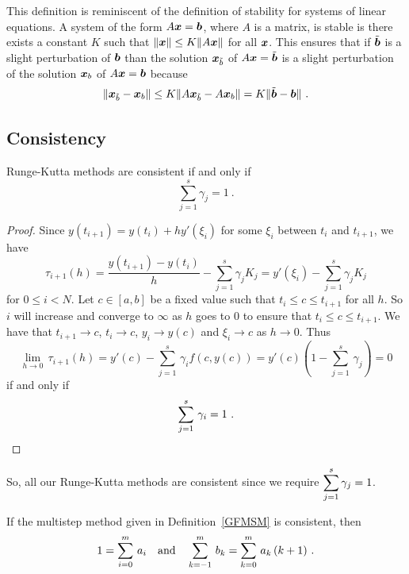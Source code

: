 \begin{rmk}
This definition is reminiscent of the definition of stability for
systems of linear equations.  A system of the form $A \bm{x} = \bm{b}$,
where $A$ is a \nn matrix, is stable is there exists a constant $K$ such
that $\|\bm{x} \| \leq K \|A \bm{x}\|$ for all $\bm{x}$.  This ensures
that if $\tilde{\bm{b}}$ is a slight perturbation of $\bm{b}$ than
the solution $\bm{x}_{\tilde{b}}$ of $A \bm{x} = \tilde{\bm{b}}$ is a slight
perturbation of the solution $\bm{x}_b$ of $A \bm{x} = \bm{b}$ because
\[
\|\bm{x}_{\tilde{b}} - \bm{x}_b \|
\leq K \|A\bm{x}_{\tilde{b}} - A \bm{x}_b \|
= K \|\tilde{\bm{b}}- \bm{b} \| \ .
\]
\end{rmk}

\subsection{Consistency}

\begin{prop}
Runge-Kutta methods are consistent if and only if
\[
\sum_{j=1}^s \gamma_j = 1 \ .
\]
\end{prop}

\begin{proof}
Since $y(t_{i+1}) = y(t_i) + h y'(\xi_i)$  for some
$\xi_i$ between $t_i$ and $t_{i+1}$, we have
\[
\tau_{i+1}(h) = \frac{y(t_{i+1}) - y(t_i)}{h} - \sum_{j=1}^s \gamma_j K_j
= y'(\xi_i) - \sum_{j=1}^s \gamma_j K_j
\]
for $0 \leq i < N$.  Let $c \in [a,b]$ be a fixed value such that
$t_i \leq c \leq t_{i+1}$ for all $h$.  So $i$ will increase and
converge to $\infty$ as $h$ goes to $0$ to ensure that
$t_i \leq c \leq t_{i+1}$.  We have that
$t_{i+1} \rightarrow c$, $t_i \rightarrow c$, $y_i \to y(c)$ and 
$\xi_i \rightarrow c$ as $h \rightarrow 0$.  Thus
\[
\lim_{h\rightarrow 0}\,\tau_{i+1}(h) = y'(c) -
\sum_{j=1}^s\,\gamma_i f(c,y(c))
= y'(c) \left( 1 - \sum_{j=1}^s\,\gamma_j \right) = 0
\]
if and only if
\[
\sum_{j=1}^s \,\gamma_i = 1 \ .  \qedhere
\]
\end{proof}

So, all our Runge-Kutta methods are consistent since we require
$\displaystyle \sum_{j=1}^s \gamma_j = 1$.

\begin{prop} \label{cond_consistency}
If the multistep method given in Definition~\ref{GFMSM} is consistent,
then
\[
1 = \sum_{i=0}^m\,a_i \\
\quad\text{and} \quad
\sum_{k=-1}^m \,b_k = \sum_{k=0}^m\,a_k\,(k+1) \ .
\]
\end{prop}

